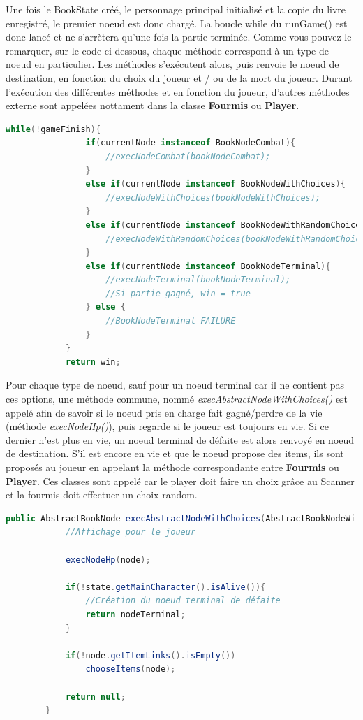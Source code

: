 		Une fois le BookState créé, le personnage principal initialisé et la copie du livre enregistré, le premier noeud est donc chargé. La boucle while du runGame() est donc lancé et ne s'arrètera qu'une fois la partie terminée. Comme vous pouvez le remarquer, sur le code ci-dessous, chaque méthode correspond à un type de noeud en particulier. Les méthodes s'exécutent alors, puis renvoie le noeud de destination, en fonction du choix du joueur et / ou de la mort du joueur. Durant l'exécution des différentes méthodes et en fonction du joueur, d'autres méthodes externe sont appelées nottament dans la classe \textbf{Fourmis} ou \textbf{Player}.

		\begin{lstlisting}[language=java, label=runGame, caption=Méthode runGame()]
			while(!gameFinish){
				if(currentNode instanceof BookNodeCombat){
					//execNodeCombat(bookNodeCombat);
				}
				else if(currentNode instanceof BookNodeWithChoices){
					//execNodeWithChoices(bookNodeWithChoices);
				}
				else if(currentNode instanceof BookNodeWithRandomChoices){
					//execNodeWithRandomChoices(bookNodeWithRandomChoices);
				}
				else if(currentNode instanceof BookNodeTerminal){
					//execNodeTerminal(bookNodeTerminal);
					//Si partie gagné, win = true
				} else {
					//BookNodeTerminal FAILURE
				}
			}
			return win;
		\end{lstlisting}

		Pour chaque type de noeud, sauf pour un noeud terminal car il ne contient pas ces options, une méthode commune, nommé \textit{execAbstractNodeWithChoices()} est appelé afin de savoir si le noeud pris en charge fait gagné/perdre de la vie (méthode \textit{execNodeHp()}), puis regarde si le joueur est toujours en vie. Si ce dernier n'est plus en vie, un noeud terminal de défaite est alors renvoyé en noeud de destination. S'il est encore en vie et que le noeud propose des items, ils sont proposés au joueur en appelant la méthode correspondante entre \textbf{Fourmis} ou \textbf{Player}. Ces classes sont appelé car le player doit faire un choix grâce au Scanner et la fourmis doit effectuer un choix random.\\

		\begin{lstlisting}[language=java, caption=Méthode execAbstractNodeWithChoices(), label=fig:JeuexecAbstractNodeWithChoices]
		public AbstractBookNode execAbstractNodeWithChoices(AbstractBookNodeWithChoices node){
			//Affichage pour le joueur

			execNodeHp(node);

			if(!state.getMainCharacter().isAlive()){
				//Création du noeud terminal de défaite
				return nodeTerminal;
			}

			if(!node.getItemLinks().isEmpty())
				chooseItems(node);

			return null;
		}
		\end{lstlisting}

